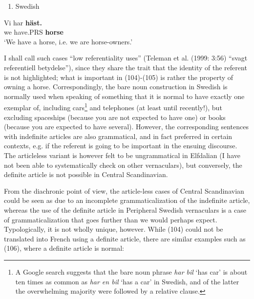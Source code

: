 \begin{enumerate} %
\item 
\label{bkm:Ref224102890}Swedish

\end{enumerate} %
\ea\label{}
\gll Vi  har  \textbf{häst.}\\


we  have.PRS  \textbf{horse}\\ %


‘We have a horse, i.e. we are horse-owners.’
\z


I shall call such cases “low referentiality uses” (Teleman et al. (1999: 3:56) “svagt referentiell betydelse”), since they share the trait that the identity of the referent is not highlighted; what is important in (104){}-(105) is rather the property of owning a horse. Correspondingly, the bare noun construction in Swedish is normally used when speaking of something that it is normal to have exactly one exemplar of, including cars\footnote{ A Google search suggests that the bare noun phrase \textit{har bil} ‘has car’ is about ten times as common as \textit{har en bil} ‘has a car’ in Swedish, and of the latter the overwhelming majority were followed by a relative clause. } and telephones (at least until recently!), but excluding spaceships (because you are not expected to have one) or books (because you are expected to have several). However, the corresponding sentences with indefinite articles are also grammatical, and in fact preferred in certain contexts, e.g. if the referent is going to be important in the ensuing discourse. The articleless variant is however felt to be ungrammatical in Elfdalian (I have not been able to systematically check on other vernaculars), but conversely, the definite article is not possible in Central Scandinavian. 

From the diachronic point of view, the article-less cases of Central Scandinavian could be seen as due to an incomplete grammaticalization of the indefinite article, whereas the use of the definite article in Peripheral Swedish vernaculars is a case of grammaticalization that goes further than we would perhaps expect. Typologically, it is not wholly unique, however. While (104) could not be translated into French using a definite article, there are similar examples such as (106), where a definite article is normal:

